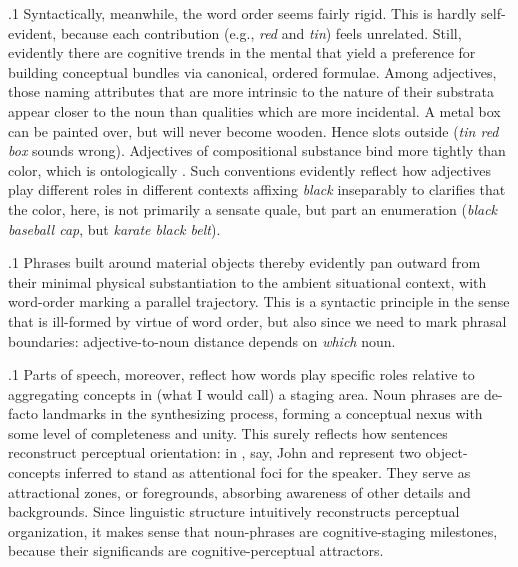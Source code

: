 \documentclass[11pt, twocolumn]{article}
\begin{document}
{{\p.1{%
Syntactically, meanwhile, the word order seems fairly rigid. This
is hardly self-evident, because each contribution
(e.g., \textit{red} and \textit{tin}) feels unrelated. Still,
evidently there are cognitive trends in the mental
 that yield a preference for
building conceptual bundles via canonical, ordered
formulae. Among adjectives, those naming attributes that are
more intrinsic to the nature of their substrata appear
closer to the noun than qualities which are more
incidental. A metal box can be painted over, but will
never become wooden. Hence  slots
outside  (\textit{tin red box} sounds wrong).
Adjectives of compositional substance bind more
tightly than color, which is ontologically .
Such conventions evidently reflect
how adjectives play different roles in different
contexts \mdash{} affixing \textit{black} inseparably to
 clarifies that the color, here, is not
primarily a sensate quale, but part
an enumeration (\textit{black baseball cap}, but
\textit{karate black belt}).
}%

\p.1{%
Phrases built around material objects thereby evidently
pan outward from their minimal physical substantiation
to the ambient situational context, with word-order
marking a parallel trajectory. This is a syntactic
principle in the sense that  is ill-formed
by virtue of word order, but also since we
need to mark phrasal boundaries: adjective-to-noun distance
depends on \textit{which} noun.
}%

\p.1{%
Parts of speech, moreover, reflect how words play
specific roles relative to aggregating concepts in
(what I would call) a  staging area.
Noun phrases are de-facto landmarks in the synthesizing
process, forming a conceptual nexus with some
level of completeness and unity. This surely reflects
how sentences reconstruct perceptual orientation:
in \jrefs{}, say, John and  represent two
object-concepts inferred to stand as
attentional foci for the speaker. They serve
as attractional zones, or foregrounds, absorbing
awareness of other details and backgrounds. Since linguistic structure
intuitively reconstructs perceptual organization,
it makes sense that noun-phrases are cognitive-staging
milestones, because their significands are cognitive-perceptual
attractors.
}%

}}
\end{document}
